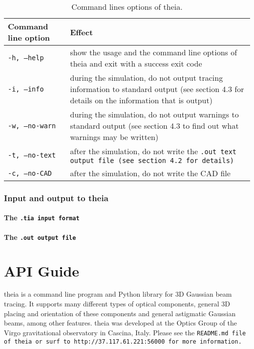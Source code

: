 \documentclass{article}
\begin{document}
\begin{table}[h]
\begin{center}
\begin{tabular}{| p{4cm} | p{10cm} |}
\hline
\textbf{Command line option} & \textbf{Effect} \\
\hline \hline
\tt{-h, --help} & show the usage and the command line options of theia and exit with a success exit code\\
\hline
\tt{-i, --info} & during the simulation, do not output tracing information to standard output (see section 4.3 for details on the information that is output)\\
\hline
\tt{-w, --no-warn} & during the simulation, do not output warnings to standard output (see section 4.3 to find out what warnings may be written)\\
\hline
\tt{-t, --no-text} & after the simulation, do not write the \tt{.out} text output file (see section 4.2 for details)\\
\hline
\tt{-c, --no-CAD} & after the simulation, do not write the CAD file\\
\hline
\end{tabular}
\end{center}
\label{option}
\caption{Command lines options of theia.}
\end{table}

\section{Input and output to theia}
\subsection{The \tt{.tia} input format}

\subsection{The \tt{.out} output file}

\part{API Guide}
theia is a command line program and Python library for 3D Gaussian beam tracing. It supports many different types of optical components, general 3D placing and orientation of these components and general astigmatic Gaussian beams, among other features. theia was developed at the Optics Group of the Virgo gravitational observatory in Cascina, Italy. Please see the \tt{README.md} file of \tt{theia} or surf to \tt{http://37.117.61.221:56000} for more information.
\end{document}
